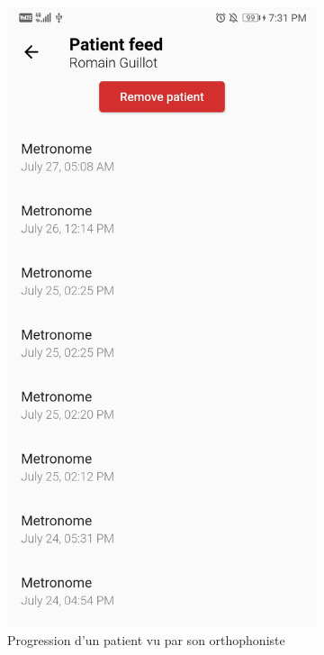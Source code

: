 \begin{appendices}
\begin{landscape}
\begin{figure}[h]
\begin{subfigure}{.25\textwidth}
    \includegraphics[width=.75\linewidth]{content/imgs/screen15.jpg}
    \caption{Progression d'un patient vu par son orthophoniste}
    \label{appendix:screen_therapist2}
  \end{subfigure}%
  \begin{subfigure}{.25\textwidth}
    \centering

\end{subfigure}
\end{figure}
\end{landscape}
\end{appendices}

